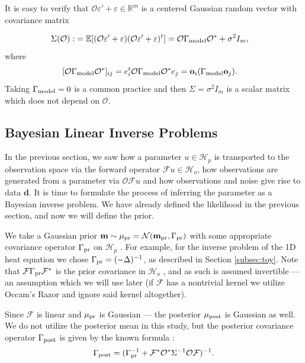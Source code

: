 \documentclass[ba]{imsart}
\newcommand{\R}{\ensuremath{\mathbb{R}}}
\newcommand{\eps}{\varepsilon}
\newcommand{\hilp}{\mathcal{H}_p}
\newcommand{\hilo}{\mathcal{H}_o}
\newcommand{\obs}{\mathcal{O}}
\newcommand{\fwd}{\mathcal{F}}
\newcommand{\data}{\mathbf{d}}
\newcommand{\param}{\mathbf{m}}
\newcommand{\normal}{\mathcal{N}}
\newcommand{\pr}{\mu_{\textup{pr}}} \newcommand{\post}{\mu_{\textup{post}}} \newcommand{\prmean}{\param_{\textup{pr}}} \newcommand{\postmean}{\param_{\textup{post}}} \newcommand{\postcov}{\Gamma_{\textup{post}}} \newcommand{\prcov}{\Gamma_{\textup{pr}}} \newcommand{\modcov}{\Gamma_{\textup{model}}} \newcommand{\tmp}{\mathcal{G}}
\newcommand{\meas}{\mathbf{o}}
\theoremstyle{plain}
\theoremstyle{definition}
\theoremstyle{remark}
\begin{document}
It is easy to verify that \(\obs \eps' + \eps \in \R^m\) is a centered
Gaussian random vector with covariance matrix

\begin{align}\label{eq:Sigma}
  \begin{split}
    \Sigma(\obs) :&= \mathbb{E}[ (\obs \eps' + \eps) (\obs \eps' +
      \eps)^t ]
= \obs \modcov \obs^* + \sigma^2I_m , 
  \end{split}
\end{align}
where
\begin{align}\label{eq:modcov_explained}
  \begin{split}
    [\obs \modcov \obs^*]_{ij} & = e_i^t \obs \modcov \obs^* e_j 
= \meas_i (\modcov \meas_j).\end{split}
\end{align}
Taking \(\modcov = 0\) is a common practice
\cite{tarantola2005,kaipio2005,Vogel02} and then \(\Sigma =
\sigma^2I_m\) is a scalar matrix which does not depend on \(\obs\).

\subsection{Bayesian Linear Inverse Problems}\label{subsec:bayesian_inverse_problems}
In the previous section, we saw how a parameter $u\in \hilp$ is
transported to the observation space via the forward operator $\fwd u
\in \hilo$, how observations are generated from a parameter via $\obs
\fwd u$ and how observations and noise give rise to data $\data$. It
is time to formulate the process of inferring the parameter as a
Bayesian inverse problem. We have already defined the likelihood in
the previous section, and now we will define the prior.

We take a Gaussian prior \(\param \sim \pr = \normal(\prmean
,\prcov)\) with some appropriate covariance operator \(\prcov\) on
\(\hilp\) \cite{Stuart10}. For example, for the inverse problem of the
1D heat equation we chose $\prcov = (-\Delta)^{-1}$, as described in
Section \ref{subsec:toy}. Note that \(\fwd \prcov \fwd^*\) is the
prior covariance in \(\hilo\) \cite{Stuart10}, and as such is assumed
invertible --- an assumption which we will use later (if \(\fwd\) has
a nontrivial kernel we utilize Occam's Razor and ignore said kernel
altogether).

Since $\fwd$ is linear and $\pr$ is Gaussian --- the posterior
\(\post\) is Gaussian as well. We do not utilize the posterior mean in
this study, but the posterior covariance operator $\postcov$ is given
by the known formula \cite{Stuart10}:
\begin{align}\label{eq:postcov}
  \postcov = (\prcov^{-1} + \fwd^* \obs^* \Sigma^{-1} \obs \fwd
  )^{-1}.
\end{align}
\end{document}

